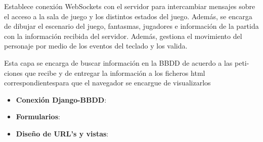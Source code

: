 \documentclass[notes,slidesec,a4]{seminar}
\begin{document}
\begin{hslide}
Establece conexión WebSockets con el servidor para intercambiar mensajes sobre el acceso a la sala de juego y los distintos estados del juego. Además, se encarga de dibujar el escenario del juego, fantasmas, jugadores e información de la partida con la información recibida del servidor. Además, gestiona el movimiento del personaje por medio de los eventos del teclado y los valida.

\end{hslide}

\begin{hslide}

\end{hslide}



\begin{hslide}
\end{hslide}



\begin{hslide}
Esta capa se encarga de buscar información en la BBDD de acuerdo a las peti-ciones que recibe y de entregar la información a los ficheros html correspondientespara que el navegador se encargue de visualizarlos
\begin{itemize}
\item \textbf{Conexión Django-BBDD}:
\item \textbf{Formularios}:
\item \textbf{Diseño de URL's y vistas}:
\end{itemize}
\end{hslide}
\end{document}
